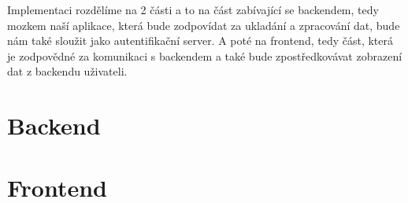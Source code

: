 Implementaci rozdělíme na 2 části a to na část zabívající se backendem, tedy mozkem naší aplikace, která bude zodpovídat
za ukladání a zpracování dat, bude nám také sloužit jako autentifikační server. A poté na frontend, tedy část, která
je zodpovědné za komunikaci s backendem a také bude zpostředkovávat zobrazení dat z backendu uživateli.

\section{Backend}

\section{Frontend}